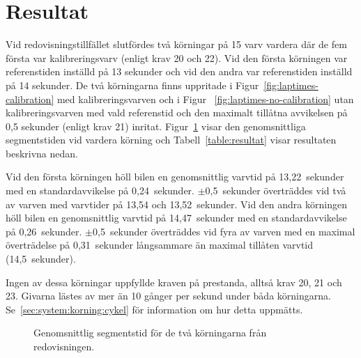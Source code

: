 \section{Resultat}

Vid redovisningstillfället slutfördes två körningar på 15 varv vardera där de
fem första var kalibreringsvarv (enligt krav 20 och 22). Vid den första
körningen var referenstiden inställd på 13 sekunder och vid den andra var
referenstiden inställd på 14 sekunder. De två körningarna finns uppritade i
Figur~\ref{fig:laptimes-calibration} med kalibreringsvarven och i Figur~
\ref{fig:laptimes-no-calibration} utan kalibreringsvarven med vald referenstid
och den maximalt tillåtna avvikelsen på 0,5 sekunder (enligt krav 21) inritat.
Figur~\ref{fig:segtimes} visar den genomsnittliga segmentstiden vid vardera
körning och Tabell~\ref{table:resultat} visar resultaten beskrivna nedan.

Vid den första körningen höll bilen en genomsnittlig varvtid på 13,22~sekunder
med en standardavvikelse på 0,24~sekunder. $\pm$0,5~sekunder överträddes vid två
av varven med varvtider på 13,54 och 13,52~sekunder. Vid den andra körningen höll bilen en genomsnittlig varvtid på 14,47~sekunder
med en standardavvikelse på 0,26~sekunder. $\pm$0,5~sekunder överträddes vid
fyra av varven med en maximal överträdelse på 0,31~sekunder långsammare än
maximal tillåten varvtid (14,5~sekunder).

Ingen av dessa körningar uppfyllde kraven på prestanda, alltså krav 20, 21 och
23. Givarna lästes av mer än 10 gånger per sekund under båda körningarna.
Se~\ref{sec:system:korning:cykel} för information om hur detta uppmätts.

\begin{figure}
	\centering
	\caption{Genomsnittlig segmentstid för de två körningarna från redovisningen.}
	\label{fig:segtimes}
\end{figure}

